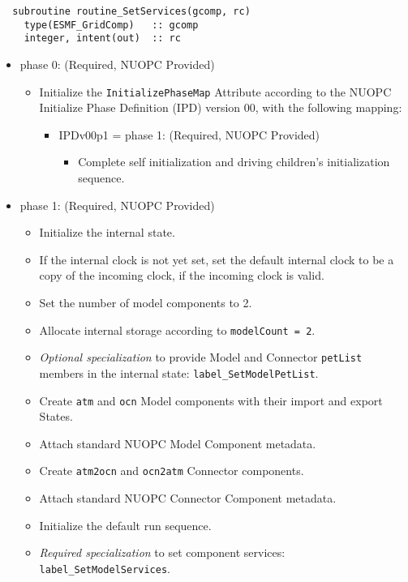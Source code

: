 \begin{verbatim}  subroutine routine_SetServices(gcomp, rc)
    type(ESMF_GridComp)   :: gcomp
    integer, intent(out)  :: rc
\end{verbatim}

\begin{itemize}
\item phase 0: ({\sc Required, NUOPC Provided})
  \begin{itemize}
  \item Initialize the {\tt InitializePhaseMap} Attribute according to the NUOPC Initialize Phase Definition (IPD) version 00, with the following mapping:
    \begin{itemize}
    \item IPDv00p1 = phase 1: ({\sc Required, NUOPC Provided})
      \begin{itemize}
      \item Complete self initialization and driving children's initialization sequence.
      \end{itemize}
    \end{itemize}  
  \end{itemize}  
\item phase 1: ({\sc Required, NUOPC Provided})
  \begin{itemize}
  \item Initialize the internal state.
  \item If the internal clock is not yet set, set the default internal clock to be a copy of the incoming clock, if the incoming clock is valid.
  \item Set the number of model components to 2.
  \item Allocate internal storage according to {\tt modelCount = 2}.
  \item {\it Optional specialization} to provide Model and Connector {\tt petList} members in the internal state: {\tt label\_SetModelPetList}.
  \item Create {\tt atm} and {\tt ocn} Model components with their import and export States.
  \item Attach standard NUOPC Model Component metadata.
  \item Create {\tt atm2ocn} and {\tt ocn2atm} Connector components.
  \item Attach standard NUOPC Connector Component metadata.
  \item Initialize the default run sequence.
  \item {\it Required specialization} to set component services: {\tt label\_SetModelServices}. 

\end{itemize}
\end{itemize}
